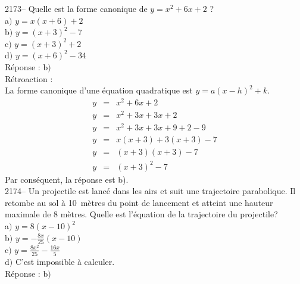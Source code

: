 \documentclass[letterpaper, 12pt]{article}
\begin{document}
2173-- Quelle est la forme canonique de $y=x^{2}+6x+2$ ?\\

a$)$ $ y=x(x+6)+2$\\
b$)$ $ y=(x+3)^{2}-7$\\
c$)$ $ y=(x+3)^{2}+2$\\
d$)$ $ y=(x+6)^{2}-34$\\

R\'eponse : b$)$\\

R\'etroaction :\\
La forme canonique d'une \'equation quadratique est $y=a(x-h)^{2}+k$.
\begin{eqnarray*}
 y&=&x^{2}+6x+2\\
 y&=&x^{2}+3x+3x+2\\
 y&=&x^{2}+3x+3x+9+2-9\\
 y&=&x(x+3)+3(x+3)-7\\
 y&=&(x+3)(x+3)-7\\
 y&=&(x+3)^{2}-7
\end{eqnarray*}
Par cons\'equent, la r\'eponse est b).\\

2174-- Un projectile est lanc\'e dans les airs et suit une trajectoire parabolique. Il retombe au sol \`a \mbox{10 m\`etres} du point de lancement et atteint une hauteur maximale de 8 m\`etres. Quelle est l'\'equation de la trajectoire du projectile? \\

a$)$ $y=8(x-10)^{2}$\\[2mm]
b$)$ $y=-\frac{8x}{25}(x-10)$\\[2mm]
c$)$ $y=\frac{8x^{2}}{25}-\frac{16x}{5}$\\[2mm]
d$)$ C'est impossible \`a calculer.\\

R\'eponse : b$)$\\
\end{document}
